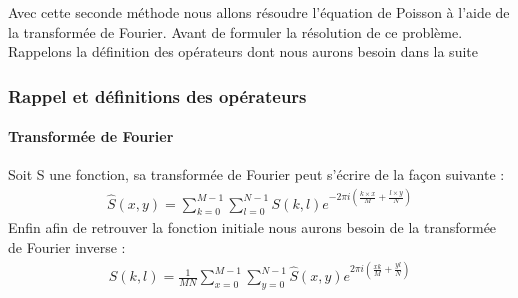Avec cette seconde méthode nous allons résoudre l'équation de Poisson à l'aide de la transformée de Fourier. Avant de formuler la résolution de ce problème. Rappelons la définition des opérateurs dont nous aurons besoin dans la suite
\subsubsection{Rappel et définitions des opérateurs}
\paragraph{Transformée de Fourier}
Soit S une fonction, sa transformée de Fourier peut s'écrire de la façon suivante : 
\begin{equation}
\begin{aligned}
\widehat{S}(x,y) = \sum_{k = 0}^{M-1} \sum_{l = 0}^{N-1} S(k,l) e^{-2\pi i\left(\frac{k\times x}{M}+\frac{l\times y}{N}\right)}
\end{aligned}
\end{equation}
Enfin afin de retrouver la fonction initiale nous aurons besoin de la transformée de Fourier inverse : 
\begin{equation}
\begin{aligned}
S(k,l) = \frac{1}{MN} \sum_{x = 0}^{M-1} \sum_{y = 0}^{N-1} \hat{S}(x,y) e^{2\pi i \left(\frac{xk}{M}+\frac{yl}{N}\right)}
\end{aligned}
\end{equation}
